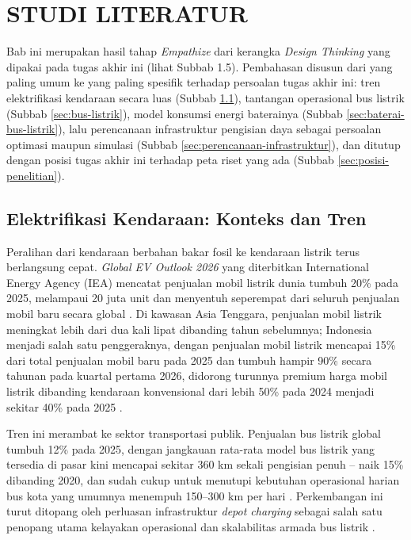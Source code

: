 \cleardoublepage %
\chapter{STUDI LITERATUR}
\label{chap:studi-literatur}

Bab ini merupakan hasil tahap \textit{Empathize} dari kerangka \textit{Design
	Thinking} yang dipakai pada tugas akhir ini (lihat Subbab 1.5). Pembahasan
disusun dari yang paling umum ke yang paling spesifik terhadap persoalan
tugas akhir ini: tren elektrifikasi kendaraan secara luas (Subbab
\ref{sec:elektrifikasi-kendaraan}), tantangan operasional bus listrik
(Subbab \ref{sec:bus-listrik}), model konsumsi energi baterainya (Subbab
\ref{sec:baterai-bus-listrik}), lalu perencanaan infrastruktur pengisian daya
sebagai persoalan optimasi maupun simulasi (Subbab
\ref{sec:perencanaan-infrastruktur}), dan ditutup dengan posisi tugas akhir
ini terhadap peta riset yang ada (Subbab \ref{sec:posisi-penelitian}).

\section{Elektrifikasi Kendaraan: Konteks dan Tren}
\label{sec:elektrifikasi-kendaraan}

Peralihan dari kendaraan berbahan bakar fosil ke kendaraan listrik terus
berlangsung cepat. \textit{Global EV Outlook 2026} yang diterbitkan
International Energy Agency (IEA) mencatat penjualan mobil listrik dunia
tumbuh 20\% pada 2025, melampaui 20 juta unit dan menyentuh seperempat dari
seluruh penjualan mobil baru secara global \autocite{iea2026}. Di kawasan
Asia Tenggara, penjualan mobil listrik meningkat lebih dari dua kali lipat
dibanding tahun sebelumnya; Indonesia menjadi salah satu penggeraknya, dengan
penjualan mobil listrik mencapai 15\% dari total penjualan mobil baru pada
2025 dan tumbuh hampir 90\% secara tahunan pada kuartal pertama 2026,
didorong turunnya premium harga mobil listrik dibanding kendaraan konvensional
dari lebih 50\% pada 2024 menjadi sekitar 40\% pada 2025 \autocite{iea2026}.

Tren ini merambat ke sektor transportasi publik. Penjualan bus listrik
global tumbuh 12\% pada 2025, dengan jangkauan rata-rata model bus listrik
yang tersedia di pasar kini mencapai sekitar 360 km sekali pengisian penuh
-- naik 15\% dibanding 2020, dan sudah cukup untuk menutupi kebutuhan
operasional harian bus kota yang umumnya menempuh 150--300 km per hari
\autocite{iea2026}. Perkembangan ini turut ditopang oleh perluasan
infrastruktur \textit{depot charging} sebagai salah satu penopang utama
kelayakan operasional dan skalabilitas armada bus listrik \autocite{iea2026}.

